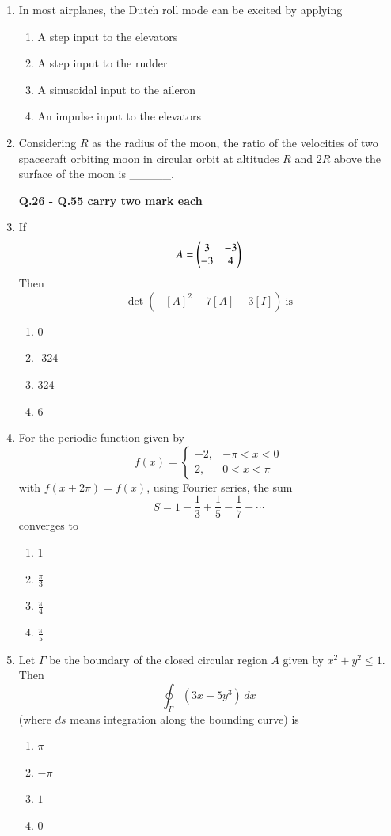 \documentclass[journal]{IEEEtran}
\begin{document}
\begin{enumerate}
\item  
In most airplanes, the Dutch roll mode can be excited by applying  
\begin{enumerate}
    \item A step input to the elevators
    \item A step input to the rudder
    \item A sinusoidal input to the aileron
    \item An impulse input to the elevators
\end{enumerate}
\hfill{}

\item 
Considering $R$ as the radius of the moon, the ratio of the velocities of two spacecraft orbiting moon in circular orbit at altitudes $R$ and $2R$ above the surface of the moon is \_\_\_\_\_.

\bigskip
\hfill{}

\textbf{\Large Q.26 - Q.55 carry two mark each}
\item  
If  
$$
A = \begin{pmatrix}
3 & -3 \\
-3 & 4
\end{pmatrix}
$$
Then  
$$
\det\left(-[A]^2 + 7[A] - 3[I] \right) \ \text{is}
$$
\begin{enumerate}
    \item 0
    \item -324
    \item 324
    \item 6
\end{enumerate}
\hfill{}

\item  
For the periodic function given by  
$$
f(x) = \begin{cases} 
-2, & -\pi < x < 0 \\
2, & 0 < x < \pi
\end{cases}
$$
with $f(x + 2\pi) = f(x)$, using Fourier series, the sum  
$$
S = 1 - \frac{1}{3} + \frac{1}{5} - \frac{1}{7} + \cdots
$$
converges to
\begin{enumerate}
    \item 1
    \item $\frac{\pi}{3}$
    \item $\frac{\pi}{4}$
    \item $\frac{\pi}{5}$
\end{enumerate}
\hfill{}

\item  
Let $\Gamma$ be the boundary of the closed circular region $A$ given by $x^2 + y^2 \leq 1$.  
Then  
$$
\oint_{\Gamma} (3x - 5y^3)\, dx
$$
(where $ds$ means integration along the bounding curve) is  
\begin{enumerate}
    \item $\pi$
    \item $-\pi$
    \item $1$
    \item $0$
\end{enumerate}
\hfill{}


\end{enumerate}
\end{document}
